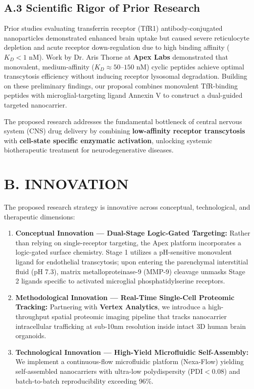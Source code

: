\documentclass[11pt,letterpaper]{article}
\begin{document}
\subsection{A.3 Scientific Rigor of Prior Research}
Prior studies evaluating transferrin receptor (TfR1) antibody-conjugated nanoparticles demonstrated enhanced brain uptake but caused severe reticulocyte depletion and acute receptor down-regulation due to high binding affinity ($K_D < 1\text{ nM}$). Work by Dr. Aris Thorne at \textbf{Apex Labs} demonstrated that monovalent, medium-affinity ($K_D \approx 50\text{--}150\text{ nM}$) cyclic peptides achieve optimal transcytosis efficiency without inducing receptor lysosomal degradation. Building on these preliminary findings, our proposal combines monovalent TfR-binding peptides with microglial-targeting ligand Annexin V to construct a dual-guided targeted nanocarrier.

\begin{innovationbox}
\small
The proposed research addresses the fundamental bottleneck of central nervous system (CNS) drug delivery by combining \textbf{low-affinity receptor transcytosis} with \textbf{cell-state specific enzymatic activation}, unlocking systemic biotherapeutic treatment for neurodegenerative diseases.
\end{innovationbox}

\vspace{-4pt}

\section{B. INNOVATION}

The proposed research strategy is innovative across conceptual, technological, and therapeutic dimensions:

\begin{enumerate}
  \item \textbf{Conceptual Innovation --- Dual-Stage Logic-Gated Targeting:} Rather than relying on single-receptor targeting, the Apex platform incorporates a logic-gated surface chemistry. Stage 1 utilizes a pH-sensitive monovalent ligand for endothelial transcytosis; upon entering the parenchymal interstitial fluid (pH 7.3), matrix metalloproteinase-9 (MMP-9) cleavage unmasks Stage 2 ligands specific to activated microglial phosphatidylserine receptors.
  \item \textbf{Methodological Innovation --- Real-Time Single-Cell Proteomic Tracking:} Partnering with \textbf{Vertex Analytics}, we introduce a high-throughput spatial proteomic imaging pipeline that tracks nanocarrier intracellular trafficking at sub-10nm resolution inside intact 3D human brain organoids.
  \item \textbf{Technological Innovation --- High-Yield Microfluidic Self-Assembly:} We implement a continuous-flow microfluidic platform (Nexa-Flow) yielding self-assembled nanocarriers with ultra-low polydispersity ($\text{PDI} < 0.08$) and batch-to-batch reproducibility exceeding 96\%.
\end{enumerate}
\end{document}
